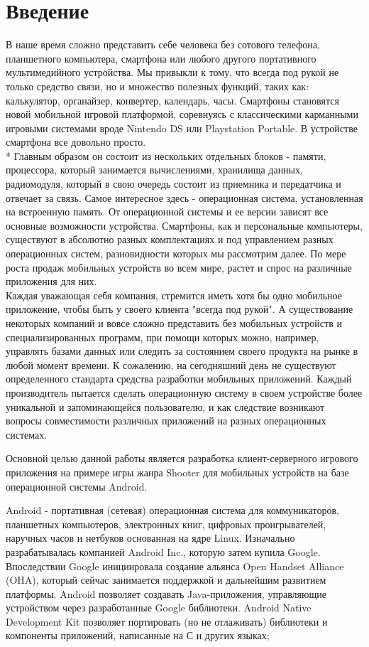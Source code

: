 \chapter*{Введение}	%
В наше время сложно представить себе человека без сотового телефона, планшетного компьютера, смартфона или любого другого портативного мультимедийного устройства. Мы привыкли к тому, что всегда под рукой не только средство связи, но и множество полезных функций, таких как: калькулятор, органайзер, конвертер, календарь, часы. Смартфоны становятся новой мобильной игровой платформой, соревнуясь с классическими карманными игровыми системами вроде Nintendo DS или Playstation Portable.
В устройстве смартфона все довольно просто. \\*
\indent
Главным образом он состоит из нескольких отдельных блоков - памяти, процессора, который занимается вычислениями, хранилища данных, радиомодуля, который в свою очередь состоит из приемника и передатчика и отвечает за связь. Самое интересное здесь - операционная система, установленная на встроенную память. От операционной системы и ее версии зависят все основные возможности устройства. Смартфоны, как и персональные компьютеры, существуют в абсолютно разных комплектациях и под управлением разных операционных систем, разновидности которых мы рассмотрим далее.
По мере роста продаж мобильных устройств во всем мире, растет и спрос на различные приложения для них. \\
\indent
Каждая уважающая себя компания, стремится иметь хотя бы одно мобильное приложение, чтобы быть у своего клиента "всегда под рукой". А существование некоторых компаний и вовсе сложно представить без мобильных устройств и специализированных программ, при помощи которых можно, например, управлять базами данных или следить за состоянием своего продукта на рынке в любой момент времени.
К сожалению, на сегодняшний день не существуют определенного стандарта средства разработки мобильных приложений. Каждый производитель пытается сделать операционную систему в своем устройстве более уникальной и запоминающейся пользователю, и как следствие возникают вопросы совместимости различных приложений на разных операционных системах.

Основной целью данной работы является разработка клиент-серверного игрового приложения на примере игры жанра Shooter для мобильных устройств на базе операционной системы Android.

Android - портативная (сетевая) операционная система для коммуникаторов, планшетных компьютеров, электронных книг, цифровых проигрывателей, наручных часов и нетбуков основанная на ядре Linux. Изначально разрабатывалась компанией Android Inc., которую затем купила Google. Впоследствии Google инициировала создание альянса Open Handset Alliance (OHA), который сейчас занимается поддержкой и дальнейшим развитием платформы. Android позволяет создавать Java-приложения, управляющие устройством через разработанные Google библиотеки. Android Native Development Kit позволяет портировать (но не отлаживать) библиотеки и компоненты приложений, написанные на С и других языках;

